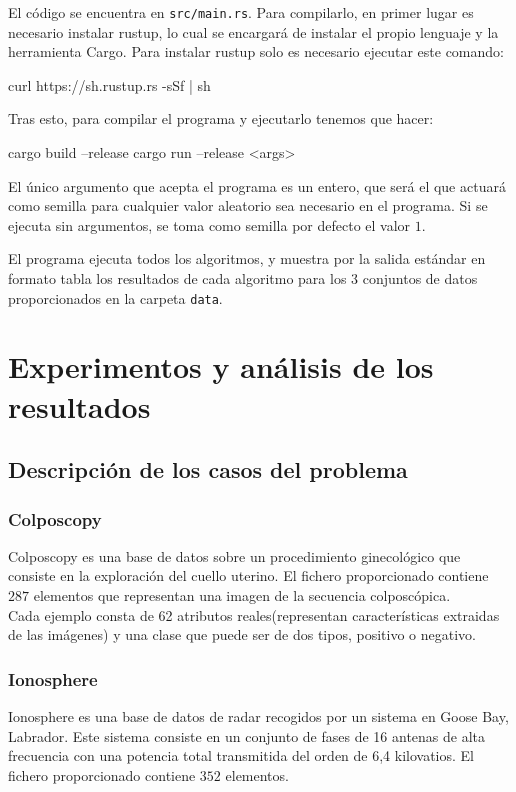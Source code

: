 \documentclass[size=a4, parskip=half, titlepage=false, toc=flat, toc=bib, 12pt]{scrartcl}
\begin{document}
El código se encuentra en \texttt{src/main.rs}. Para compilarlo, en primer lugar es necesario instalar rustup, lo cual se encargará de instalar el propio lenguaje y la herramienta Cargo. Para instalar rustup solo es necesario ejecutar este comando:
\begin{shell}
curl https://sh.rustup.rs -sSf | sh
\end{shell}

Tras esto, para compilar el programa y ejecutarlo tenemos que hacer:
\begin{shell}
cargo build --release
cargo run --release <args>
\end{shell}

El único argumento que acepta el programa es un entero, que será el que actuará como semilla para cualquier valor aleatorio sea necesario en el programa. Si se ejecuta sin argumentos, se toma como semilla por defecto el valor $1$.

El programa ejecuta todos los algoritmos, y muestra por la salida estándar en formato tabla los resultados de cada algoritmo para los 3 conjuntos de datos proporcionados en la carpeta \texttt{data}.

\newpage

\section{Experimentos y análisis de los resultados}
\subsection{Descripción de los casos del problema}
\subsubsection{Colposcopy}
Colposcopy es una base de datos sobre un procedimiento ginecológico que consiste en la exploración del cuello uterino. El fichero proporcionado contiene $287$ elementos que representan una imagen de la secuencia colposcópica.\\

Cada ejemplo consta de 62 atributos reales(representan características extraidas de las imágenes) y una clase que puede ser de dos tipos, positivo o negativo.

\subsubsection{Ionosphere}
Ionosphere es una base de datos de radar recogidos por un sistema en Goose Bay, Labrador. Este sistema consiste en un conjunto de fases de 16 antenas de alta frecuencia con una potencia total transmitida del orden de 6,4 kilovatios. El fichero proporcionado contiene $352$ elementos.
\end{document}
